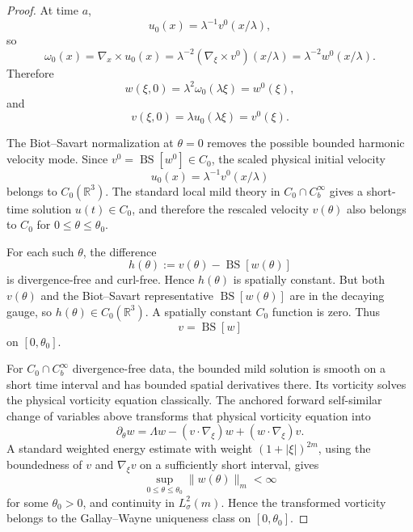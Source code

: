 \documentclass[11pt]{amsart}
\theoremstyle{plain}
\theoremstyle{definition}
\theoremstyle{remark}
\numberwithin{equation}{section}
\begin{document}
\begin{proof}
At time \(a\),
\[
   u_0(x)=\lambda^{-1}v^0(x/\lambda),
\]
so
\[
   \omega_0(x)
   =
   \nabla_x\times u_0(x)
   =
   \lambda^{-2}(\nabla_\xi\times v^0)(x/\lambda)
   =
   \lambda^{-2}w^0(x/\lambda).
\]
Therefore
\[
   w(\xi,0)
   =
   \lambda^2\omega_0(\lambda\xi)
   =
   w^0(\xi),
\]
and
\[
   v(\xi,0)
   =
   \lambda u_0(\lambda\xi)
   =
   v^0(\xi).
\]

The Biot--Savart normalization at \(\theta=0\) removes the possible bounded
harmonic velocity mode.  Since \(v^0=\operatorname{BS}[w^0]\in C_0\), the
scaled physical initial velocity
\[
   u_0(x)=\lambda^{-1}v^0(x/\lambda)
\]
belongs to \(C_0(\mathbb R^3)\).  The standard local mild theory in
\(C_0\cap C_b^\infty\) gives a short-time solution \(u(t)\in C_0\), and
therefore the rescaled velocity \(v(\theta)\) also belongs to \(C_0\) for
\(0\le\theta\le\theta_0\).

For each such \(\theta\), the difference
\[
   h(\theta):=v(\theta)-\operatorname{BS}[w(\theta)]
\]
is divergence-free and curl-free.  Hence \(h(\theta)\) is spatially constant.
But both \(v(\theta)\) and the Biot--Savart representative
\(\operatorname{BS}[w(\theta)]\) are in the decaying gauge, so
\(h(\theta)\in C_0(\mathbb R^3)\).  A spatially constant \(C_0\) function is
zero.  Thus
\[
   v=\operatorname{BS}[w]
\]
on \([0,\theta_0]\).

For \(C_0\cap C_b^\infty\) divergence-free data, the bounded mild solution is
smooth on a short time interval and has bounded spatial derivatives there.  Its
vorticity solves the physical vorticity equation classically.  The anchored forward
self-similar change of variables above transforms that physical vorticity
equation into
\[
   \partial_\theta w
   =
   \Lambda w-(v\cdot\nabla_\xi)w+(w\cdot\nabla_\xi)v.
\]
A standard weighted energy estimate with weight \((1+|\xi|)^{2m}\), using the
boundedness of \(v\) and \(\nabla_\xi v\) on a sufficiently short interval, gives
\[
   \sup_{0\le\theta\le\theta_0}\|w(\theta)\|_m<\infty
\]
for some \(\theta_0>0\), and continuity in \(L^2_\sigma(m)\).  Hence the
transformed vorticity belongs to the Gallay--Wayne uniqueness class on
\([0,\theta_0]\).
\end{proof}
\end{document}
